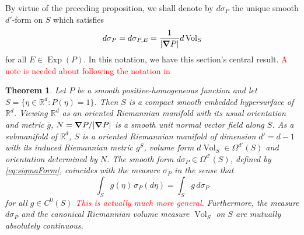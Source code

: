 \documentclass[11pt]{article}
\newtheorem{theorem}{Theorem}[section]
\newcommand\Exp{\operatorname{Exp}}
\newcommand{\Vol}{\operatorname{Vol}}
\begin{document}
By virtue of the preceding proposition, we shall denote by $d\sigma_P$ the unique smooth $d'$-form on $S$ which satisfies
\begin{equation}\label{eq:sigmaForm}
    d\sigma_P=d\sigma_{P,E}=\frac{1}{|\grad P|}d\Vol_S
\end{equation}
for all $E\in\Exp(P)$. In this notation, we have this section's central result. \textcolor{red}{A note is needed about following the notation in \cite{Amann2009}}




\begin{theorem}\label{thm:RiemannLebesgue}
Let $P$ be a smooth positive-homogeneous function and let $S=\{\eta\in\mathbb{R}^d:P(\eta)=1\}$. Then $S$ is a compact smooth embedded hypersurface of $\mathbb{R}^d$. Viewing $\mathbb{R}^d$ as an oriented Riemannian manifold with its usual orientation and metric $\overline{g}$, $N=\grad P/|\grad P|$ is a smooth unit normal vector field along $S$. As a submanifold of $\mathbb{R}^d$, $S$ is a oriented Riemannian manifold of dimension $d'=d-1$ with its induced Riemannian metric $g^S$, volume form $d\Vol_S\in\Omega^{d'}(S)$ and orientation determined by $N$. The smooth form $d\sigma_P\in\Omega^{d'}(S)$, defined by \eqref{eq:sigmaForm}, coincides with the measure $\sigma_P$ in the sense that
\begin{equation*}
\int_S g(\eta)\,\sigma_P(d\eta)=\int_S g\,d\sigma_P
\end{equation*}
for all $g\in C^0(S)$ \textcolor{red}{This is actually much more general}. Furthermore, the measure $d\sigma_P$ and the canonical Riemannian volume measure $\Vol_S$ on $S$ are mutually absolutely continuous.
\end{theorem} 
\end{document}
